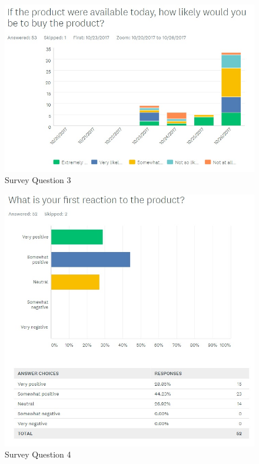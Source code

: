 \documentclass[12pt,a4paper]{article}
\begin{document}
\begin{appendices}
        \begin{figure}[H]
          \centering
          \includegraphics[width=1\textwidth]{assets/12-2-survey-3.jpg}
          \caption{Survey Question 3}
          \label{fig:Survey Question 3}
        \end{figure}

        \begin{figure}[H]
          \centering
          \includegraphics[width=1\textwidth]{assets/12-2-survey-4.jpg}
          \caption{Survey Question 4}
          \label{fig:Survey Question 4}
        \end{figure}


\end{appendices}
\end{document}

